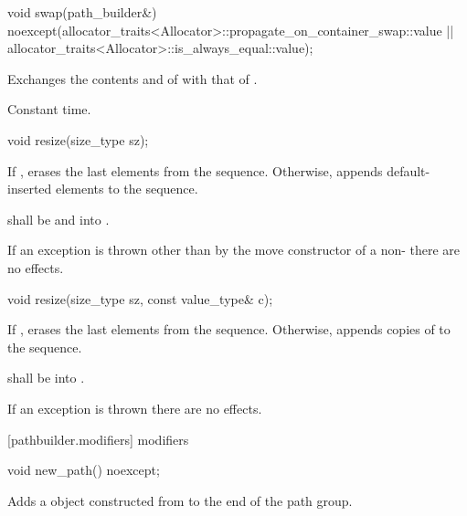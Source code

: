 \begin{itemdecl}
void swap(path_builder&)
  noexcept(allocator_traits<Allocator>::propagate_on_container_swap::value ||
  allocator_traits<Allocator>::is_always_equal::value);
\end{itemdecl}
\begin{itemdescr}
\pnum
\effects
Exchanges the contents and
of
with that of .

\pnum
\complexity
Constant time.
\end{itemdescr}

\begin{itemdecl}
void resize(size_type sz);
\end{itemdecl}
\begin{itemdescr}
\pnum
\effects
If , erases the last  elements
from the sequence. Otherwise, appends  default-inserted 
elements to the sequence.

\pnum
\requires
{} shall be
 and  into .

\pnum
\remarks
If an exception is thrown other than by the move constructor of a 
non-
 there are no effects.
\end{itemdescr}

\begin{itemdecl}
void resize(size_type sz, const value_type& c);
\end{itemdecl}
\begin{itemdescr}
\pnum
\effects
If , erases the last  elements
from the sequence. Otherwise,
appends  copies of  to the sequence.

\pnum
\requires
{} shall be  into .

\pnum
\remarks
If an exception is thrown there are no effects.
\end{itemdescr}

 [pathbuilder.modifiers] { modifiers}

\begin{itemdecl}
void new_path() noexcept;
\end{itemdecl}
\begin{itemdescr}
\pnum
\effects
Adds a  object constructed from  to the end of the path group.
\end{itemdescr}


